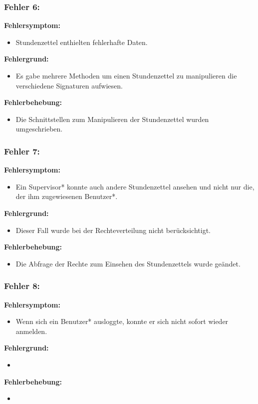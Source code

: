 \subsubsection{Fehler 6:} %
\textbf{Fehlersymptom:}
	\begin{itemize}
		\item Stundenzettel enthielten fehlerhafte Daten.
	\end{itemize}
\textbf{Fehlergrund:}
	\begin{itemize}
		\item Es gabe mehrere Methoden um einen Stundenzettel zu manipulieren die verschiedene Signaturen aufwiesen.
	\end{itemize}
\textbf{Fehlerbehebung:}
	\begin{itemize}
		\item Die Schnittstellen zum Manipulieren der Stundenzettel wurden umgeschrieben.
	\end{itemize}

\subsubsection{Fehler 7:} %
\textbf{Fehlersymptom:}
	\begin{itemize}
		\item Ein Supervisor* konnte auch andere Stundenzettel ansehen und nicht nur die, der ihm zugewiesenen Benutzer*.
	\end{itemize}
\textbf{Fehlergrund:}
	\begin{itemize}
		\item Dieser Fall wurde bei der Rechteverteilung nicht berücksichtigt.
	\end{itemize}
\textbf{Fehlerbehebung:}
	\begin{itemize}
		\item Die Abfrage der Rechte zum Einsehen des Stundenzettels wurde geändet.
	\end{itemize}

\subsubsection{Fehler 8:} %
\textbf{Fehlersymptom:}
	\begin{itemize}
		\item Wenn sich ein Benutzer* ausloggte, konnte er sich nicht sofort wieder anmelden.
	\end{itemize}
\textbf{Fehlergrund:}
	\begin{itemize}
		\item 
	\end{itemize}
\textbf{Fehlerbehebung:}
	\begin{itemize}
		\item 
	\end{itemize}

